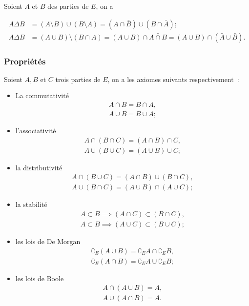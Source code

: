 \begin{prop}
  Soient \(A\) et \(B\) des parties de \(E\), on a 

  \begin{align}
    A \Delta B &= (A\setminus B) \cup (B \setminus A) = (A \cap \bar{B}) \cup (B 
    \cap \bar{A}); \\
    A \Delta B &= (A \cup B) \setminus (B \cap A) = (A \cup B) \cap \bar{A \cap 
    B}  = (A \cup B) \cap (\bar{A} \cup \bar{B}).
  \end{align}
\end{prop}

\subsubsection{Propriétés}
\label{chap3-subsubsec:prop}

\begin{axiome}
  Soient \(A, B\) et \(C\) trois parties de \(E\), on a les axiomes suivants 
  respectivement~:
  \begin{itemize}
    \item La commutativité
      \begin{gather}
        A \cap B= B \cap A, \\
        A \cup B = B \cup A;
      \end{gather}
    \item l'associativité
      \begin{gather}
        A \cap (B \cap C) = (A \cap B) \cap C, \\ 
        A \cup (B \cup C) = (A \cup B) \cup C;
      \end{gather}
    \item la distributivité
      \begin{gather}
        A \cap (B \cup C) = (A \cap B) \cup (B \cap C), \\ 
        A \cup (B \cap C) = (A \cup B) \cap (A \cup C);
      \end{gather}
    \item la stabilité
      \begin{gather}
        A \subset B \implies (A \cap C) \subset (B \cap C), \\ 
        A \subset B \implies (A \cup C) \subset (B \cup C);
      \end{gather}
    \item les lois de De Morgan
      \begin{gather}
        \complement_E (A \cup B) = \complement_E A \cap \complement_E B, \\ 
        \complement_E (A \cap B) = \complement_E A \cup \complement_E B;
      \end{gather}
    \item les lois de Boole
      \begin{gather}
        A \cap (A \cup B) = A, \\ 
        A \cup (A \cap B) = A.
      \end{gather}
  \end{itemize}
\end{axiome}

